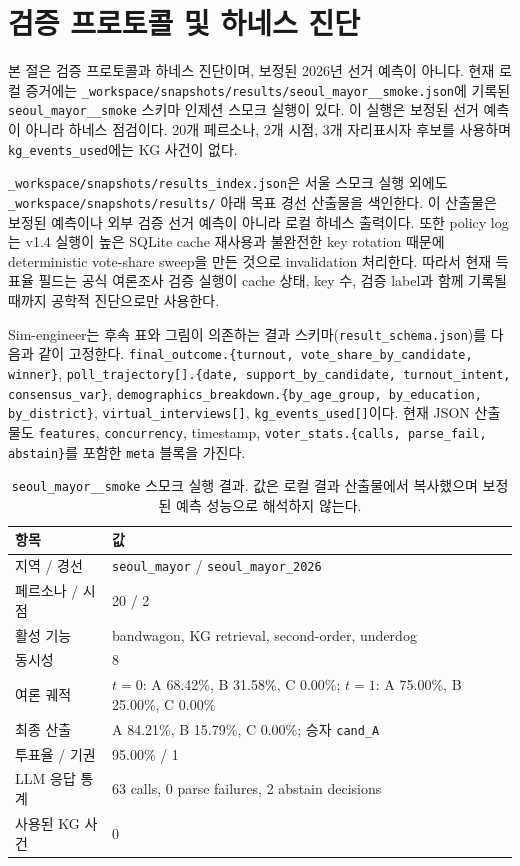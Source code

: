 \documentclass[11pt]{article}
\begin{document}
\section{검증 프로토콜 및 하네스 진단}
\label{sec:results}

본 절은 검증 프로토콜과 하네스 진단이며, 보정된 2026년 선거 예측이 아니다. 현재 로컬 증거에는 \texttt{\_workspace/snapshots/results/seoul\_mayor\_\_smoke.json}에 기록된 \texttt{seoul\_mayor\_\_smoke} 스키마 인제션 스모크 실행이 있다. 이 실행은 보정된 선거 예측이 아니라 하네스 점검이다. 20개 페르소나, 2개 시점, 3개 자리표시자 후보를 사용하며 \texttt{kg\_events\_used}에는 KG 사건이 없다.

\texttt{\_workspace/snapshots/results\_index.json}은 서울 스모크 실행 외에도 \texttt{\_workspace/snapshots/results/} 아래 목표 경선 산출물을 색인한다. 이 산출물은 보정된 예측이나 외부 검증 선거 예측이 아니라 로컬 하네스 출력이다. 또한 policy log는 v1.4 실행이 높은 SQLite cache 재사용과 불완전한 key rotation 때문에 deterministic vote-share sweep을 만든 것으로 invalidation 처리한다. 따라서 현재 득표율 필드는 공식 여론조사 검증 실행이 cache 상태, key 수, 검증 label과 함께 기록될 때까지 공학적 진단으로만 사용한다.

Sim-engineer는 후속 표와 그림이 의존하는 결과 스키마(\texttt{result\_schema.json})를 다음과 같이 고정한다. \texttt{final\_outcome.\{turnout, vote\_share\_by\_candidate, winner\}}, \texttt{poll\_trajectory[].\{date, support\_by\_candidate, turnout\_intent, consensus\_var\}}, \texttt{demographics\_breakdown.\{by\_age\_group, by\_education, by\_district\}}, \texttt{virtual\_interviews[]}, \texttt{kg\_events\_used[]}이다. 현재 JSON 산출물도 \texttt{features}, \texttt{concurrency}, timestamp, \texttt{voter\_stats.\{calls, parse\_fail, abstain\}}를 포함한 \texttt{meta} 블록을 가진다.

\begin{table}[h]
\centering
\caption{\texttt{seoul\_mayor\_\_smoke} 스모크 실행 결과. 값은 로컬 결과 산출물에서 복사했으며 보정된 예측 성능으로 해석하지 않는다.}
\label{tab:smoke-result}
\small
\begin{tabular}{ll}
\toprule
항목 & 값 \\
\midrule
지역 / 경선 & \texttt{seoul\_mayor} / \texttt{seoul\_mayor\_2026} \\
페르소나 / 시점 & 20 / 2 \\
활성 기능 & bandwagon, KG retrieval, second-order, underdog \\
동시성 & 8 \\
여론 궤적 & $t=0$: A 68.42\%, B 31.58\%, C 0.00\%; $t=1$: A 75.00\%, B 25.00\%, C 0.00\% \\
최종 산출 & A 84.21\%, B 15.79\%, C 0.00\%; 승자 \texttt{cand\_A} \\
투표율 / 기권 & 95.00\% / 1 \\
LLM 응답 통계 & 63 calls, 0 parse failures, 2 abstain decisions \\
사용된 KG 사건 & 0 \\
\bottomrule
\end{tabular}
\end{table}
\end{document}
